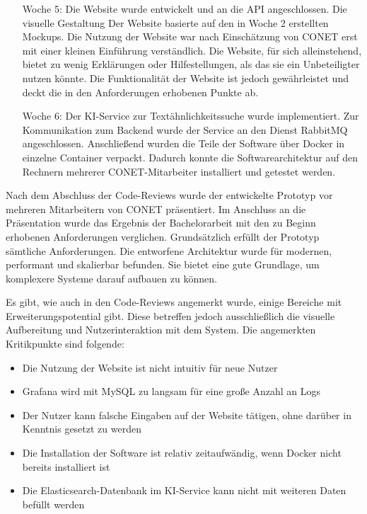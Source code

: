 \begin{itemize}[leftmargin=6em]
\item [Woche 5:] Die Website wurde entwickelt und an die API angeschlossen. Die visuelle Gestaltung Der Website basierte auf den in Woche 2 erstellten Mockups. Die Nutzung der Website war nach Einschätzung von CONET erst mit einer kleinen Einführung verständlich. Die Website, für sich alleinstehend, bietet zu wenig Erklärungen oder Hilfestellungen, als das sie ein Unbeteiligter nutzen könnte. Die Funktionalität der Website ist jedoch gewährleistet und deckt die in den Anforderungen erhobenen Punkte ab.
\item [Woche 6:] Der KI-Service zur Textähnlichkeitssuche wurde implementiert. Zur Kommunikation zum Backend wurde der Service an den Dienst RabbitMQ angeschlossen. Anschließend wurden die Teile der Software über Docker in einzelne Container verpackt. Dadurch konnte die Softwarearchitektur auf den Rechnern mehrerer CONET-Mitarbeiter installiert und getestet werden.
\end{itemize}

Nach dem Abschluss der Code-Reviews wurde der entwickelte Prototyp vor mehreren Mitarbeitern von CONET präsentiert. Im Anschluss an die Präsentation wurde das Ergebnis der Bachelorarbeit mit den zu Beginn erhobenen Anforderungen verglichen. Grundsätzlich erfüllt der Prototyp sämtliche Anforderungen. Die entworfene Architektur wurde für modernen, performant und skalierbar befunden. Sie bietet eine gute Grundlage, um komplexere Systeme darauf aufbauen zu können.

Es gibt, wie auch in den Code-Reviews angemerkt wurde, einige Bereiche mit Erweiterungspotential gibt. Diese betreffen jedoch ausschließlich die visuelle Aufbereitung und Nutzerinteraktion mit dem System. Die angemerkten Kritikpunkte sind folgende:

\begin{itemize}
\item Die Nutzung der Website ist nicht intuitiv für neue Nutzer
\item Grafana wird mit MySQL zu langsam für eine große Anzahl an Logs
\item Der Nutzer kann falsche Eingaben auf der Website tätigen, ohne darüber in Kenntnis gesetzt zu werden
\item Die Installation der Software ist relativ zeitaufwändig, wenn Docker nicht bereits installiert ist
\item Die Elasticsearch-Datenbank im KI-Service kann nicht mit weiteren Daten befüllt werden
\end{itemize}
  